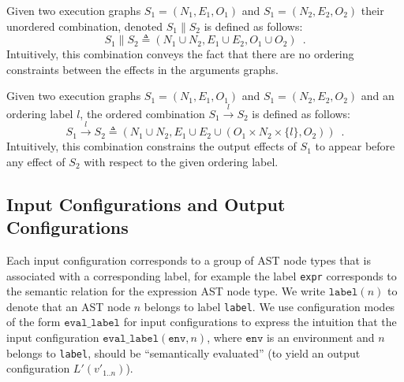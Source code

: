 \documentclass{book}
\newcommand\ordered[3]{{#1}\xrightarrow{#2}{#3}}
\newcommand\env[0]{\texttt{env}}
\begin{document}
Given two execution graphs $S_1 = (N_1, E_1, O_1)$ and $S_1 = (N_2, E_2, O_2)$ their unordered combination,
denoted $S_1 \parallel S_2$ is defined as follows:
\[
  S_1 \parallel S_2\triangleq (N_1 \cup N_2, E_1 \cup E_2, O_1 \cup O_2) \enspace.
\]
Intuitively, this combination conveys the fact that there are no ordering constraints between the effects
in the arguments graphs.

Given two execution graphs $S_1 = (N_1, E_1, O_1)$ and $S_1 = (N_2, E_2, O_2)$ and an ordering label $l$,
the ordered combination $\ordered{S_1}{l}{S_2}$ is defined as follows:
\[
  \ordered{S_1}{l}{S_2} \triangleq (N_1 \cup N_2, E_1 \cup E_2 \cup (O_1 \times N_2 \times \{l\}, O_2)) \enspace.
\]
Intuitively, this combination constrains the output effects of $S_1$ to appear before any effect of $S_2$ with respect
to the given ordering label.

\subsection{Input Configurations and Output Configurations}

Each input configuration corresponds to a group of AST node types that is associated with a corresponding
label, for example the label \texttt{expr} corresponds to the semantic relation for the expression AST node type.
We write $\texttt{label}(n)$ to denote that an AST node $n$ belongs to label \texttt{label}.
%
We use configuration modes of the form $\texttt{eval\_label}$ for input configurations to express the intuition
that the input configuration $\texttt{eval\_label}(\env, n)$, where $\env$ is an environment
and $n$ belongs to \texttt{label},
should be ``semantically evaluated'' (to yield an output configuration $L'(v'_{1..n})$).
\end{document}
